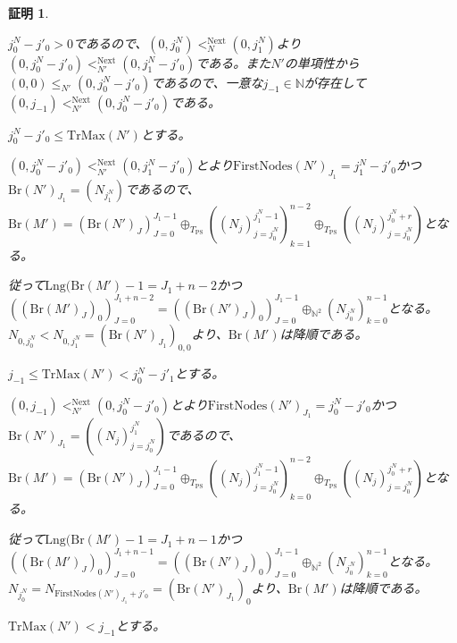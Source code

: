 \documentclass[dvipdfmx,uplatex]{jsarticle}
\theoremstyle{customnonumberbreakfortheorem}
\theoremstyle{customnonumberbreakforproof}
\newtheorem{hideableproof}{証明}
\begin{document}
\begin{hideableproof}
\begin{indented}
\begin{indented}
\begin{indented}
\begin{indented}
					\item \(j_0^N-j'_0 > 0\)であるので、\((0,j_0^N) <_N^{\textrm{Next}} (0,j_1^N)\)より\((0,j_0^N-j'_0) <_{N'}^{\textrm{Next}} (0,j_1^N-j'_0)\)である。また\(N'\)の単項性から\((0,0) \leq_{N'} (0,j_0^N-j'_0)\)であるので、一意な\(j_{-1} \in \mathbb{N}\)が存在して\((0,j_{-1}) <_{N'}^{\textrm{Next}} (0,j_0^N-j'_0)\)である。
					\item
					\item \(j_0^N-j'_0 \leq \textrm{TrMax}(N')\)とする。
					\begin{indented}
						\item \((0,j_0^N-j'_0) <_{N'}^{\textrm{Next}} (0,j_1^N-j'_0)\)とより\(\textrm{FirstNodes}(N')_{J_1} = j_1^N-j'_0\)かつ\(\textrm{Br}(N')_{J_1} = (N_{j_1^N})\)であるので、\(\textrm{Br}(M') = (\textrm{Br}(N')_J)_{J=0}^{J_1-1} \oplus_{T_{\textrm{PS}}} ((N_j)_{j=j_0^N}^{j_1^N-1})_{k=1}^{n-2} \oplus_{T_{\textrm{PS}}} ((N_j)_{j=j_0^N}^{j_0^N+r})\)となる。
						\item 従って\(\textrm{Lng}(\textrm{Br}(M')-1 = J_1+n-2\)かつ\(((\textrm{Br}(M')_J)_0)_{J=0}^{J_1+n-2} = ((\textrm{Br}(N')_J)_0)_{J=0}^{J_1-1} \oplus_{\mathbb{N}^2} (N_{j_0^N})_{k=0}^{n-1}\)となる。\(N_{0,j_0^N} < N_{0,j_1^N} = (\textrm{Br}(N')_{J_1})_{0,0}\)より、\(\textrm{Br}(M')\)は降順である。
					\end{indented}
					\item
					\item \(j_{-1} \leq \textrm{TrMax}(N') < j_0^N-j'_1\)とする。
					\begin{indented}
						\item \((0,j_{-1}) <_{N'}^{\textrm{Next}} (0,j_0^N-j'_0)\)とより\(\textrm{FirstNodes}(N')_{J_1} = j_0^N-j'_0\)かつ\(\textrm{Br}(N')_{J_1} = ((N_j)_{j=j_0^N}^{j_1^N})\)であるので、\(\textrm{Br}(M') = (\textrm{Br}(N')_J)_{J=0}^{J_1-1} \oplus_{T_{\textrm{PS}}} ((N_j)_{j=j_0^N}^{j_1^N-1})_{k=0}^{n-2} \oplus_{T_{\textrm{PS}}} ((N_j)_{j=j_0^N}^{j_0^N+r})\)となる。
						\item 従って\(\textrm{Lng}(\textrm{Br}(M')-1 = J_1+n-1\)かつ\(((\textrm{Br}(M')_J)_0)_{J=0}^{J_1+n-1} = ((\textrm{Br}(N')_J)_0)_{J=0}^{J_1-1} \oplus_{\mathbb{N}^2} (N_{j_0^N})_{k=0}^{n-1}\)となる。\(N_{j_0^N} = N_{\textrm{FirstNodes}(N')_{J_1}+j'_0} = (\textrm{Br}(N')_{J_1})_0\)より、\(\textrm{Br}(M')\)は降順である。
					\end{indented}
					\item
					\item \(\textrm{TrMax}(N') < j_{-1}\)とする。

\end{indented}
\end{indented}
\end{indented}
\end{indented}
\end{hideableproof}
\end{document}
